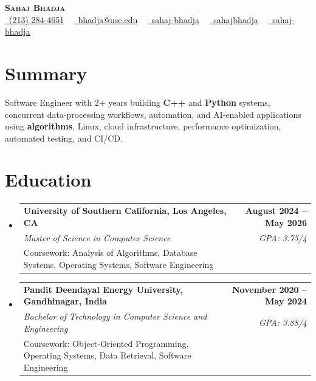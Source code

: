 \documentclass[letterpaper,10pt]{article}
\makeatletter
\newcommand{\sectionGap}{\vspace{-8pt}}
\newcommand{\resumeEduSubheading}[5]{\vspace{-1pt}\item\begin{tabular*}{1.0\textwidth}[t]{l@{\extracolsep{\fill}}r}\textbf{#1} & \textbf{\small #2} \\\textit{\small #3} & \textit{\small #4} \\\small #5 & \\\end{tabular*}\vspace{-4pt}}
\newcommand{\resumeSubHeadingListStart}{\begin{itemize}[leftmargin=0.0in, label={}]}
\newcommand{\resumeSubHeadingListEnd}{\end{itemize}}
\makeatother
\begin{document}
\begin{center}
{\Huge \scshape \textbf{Sahaj Bhadja}} \\ \vspace{1pt}
\small \href{tel:2132844651}{\faPhone\ \underline{(213) 284-4651}} ~ \href{mailto:bhadja@usc.edu}{\raisebox{-0.2\height}\faEnvelope\ \underline{bhadja@usc.edu}} ~
\href{https://www.linkedin.com/in/sahaj-bhadja/}{\raisebox{-0.2\height}\faLinkedin\ \underline{sahaj-bhadja}} ~ \href{https://github.com/SAHAJ-BHADJA}{\raisebox{-0.2\height}\faGithub\ \underline{sahajbhadja}} ~
\href{https://sahaj-bhadja.vercel.app/}{\raisebox{-0.2\height}\faGlobe\ \underline{sahaj-bhadja}}
\end{center}
\vspace{-16pt}
\section{Summary}
\begin{itemize}[leftmargin=0.15in, label={}]
\small{\item{Software Engineer with 2+ years building \textbf{C++} and \textbf{Python} systems, concurrent data-processing workflows, automation, and AI-enabled applications using \textbf{algorithms}, Linux, cloud infrastructure, performance optimization, automated testing, and CI/CD.}}
\end{itemize}
\sectionGap
\section{Education}
\resumeSubHeadingListStart
\resumeEduSubheading{University of Southern California, Los Angeles, CA}{August 2024 -- May 2026}{Master of Science in Computer Science}{GPA: 3.75/4}{Coursework: Analysis of Algorithms, Database Systems, Operating Systems, Software Engineering}
\resumeEduSubheading{Pandit Deendayal Energy University, Gandhinagar, India}{November 2020 -- May 2024}{Bachelor of Technology in Computer Science and Engineering}{GPA: 3.88/4}{Coursework: Object-Oriented Programming, Operating Systems, Data Retrieval, Software Engineering}
\resumeSubHeadingListEnd
\sectionGap
\end{document}
